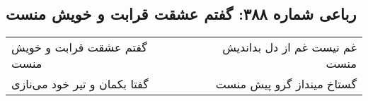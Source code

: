 \begin{center}
\section*{رباعی شماره ۳۸۸: گفتم عشقت قرابت و خویش منست}
\label{sec:0388}
\begin{longtable}{l p{0.5cm} r}
گفتم عشقت قرابت و خویش منست
&&
غم نیست غم از دل بداندیش منست
\\
گفتا بکمان و تیر خود می‌نازی
&&
گستاخ مینداز گرو پیش منست
\\
\end{longtable}
\end{center}
